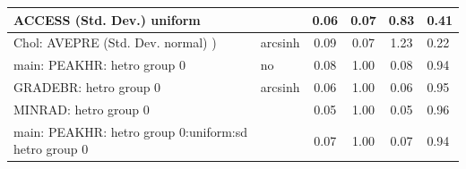 \begin{table}
\begin{center}
\begin{tabular}{|l|l|c|c|c|l|}
			\hline
			ACCESS (Std. Dev.) uniform &  & 0.06 & 0.07 & 0.83 & 0.41 \\
			\hline
			 Chol: AVEPRE (Std. Dev. normal) ) & arcsinh & 0.09 & 0.07 & 1.23 & 0.22 \\
			\hline
			main: PEAKHR: hetro group 0 & no & 0.08 & 1.00 & 0.08 & 0.94 \\
			\hline
			GRADEBR: hetro group 0 & arcsinh & 0.06 & 1.00 & 0.06 & 0.95 \\
			\hline
			MINRAD: hetro group 0 &  & 0.05 & 1.00 & 0.05 & 0.96 \\
			\hline
			main: PEAKHR: hetro group 0:uniform:sd  hetro group 0 &  & 0.07 & 1.00 & 0.07 & 0.94 \\
			\hline
		\end{tabular}
	\end{center}
\end{table}